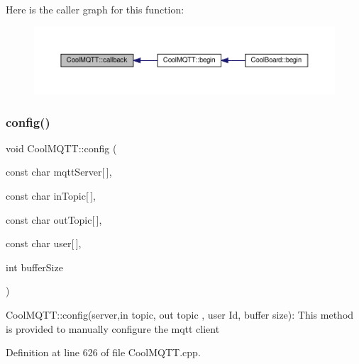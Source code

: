 Here is the caller graph for this function\+:\nopagebreak
\begin{figure}[H]
\begin{center}
\leavevmode
\includegraphics[width=350pt]{d0/dd0/class_cool_m_q_t_t_a30d82ad665bfb603f46ecdbc290775df_icgraph}
\end{center}
\end{figure}
\mbox{\label{class_cool_m_q_t_t_a9b703de4f1358f0ee7a5e8c44979c648}} 
\subsubsection{\texorpdfstring{config()}{config()}\hspace{0.1cm}{\footnotesize\ttfamily [1/2]}}
{\footnotesize\ttfamily void Cool\+M\+Q\+T\+T\+::config (\begin{DoxyParamCaption}\item[{const char}]{mqtt\+Server\mbox{[}$\,$\mbox{]},  }\item[{const char}]{in\+Topic\mbox{[}$\,$\mbox{]},  }\item[{const char}]{out\+Topic\mbox{[}$\,$\mbox{]},  }\item[{const char}]{user\mbox{[}$\,$\mbox{]},  }\item[{int}]{buffer\+Size }\end{DoxyParamCaption})}

Cool\+M\+Q\+T\+T\+::config(server,in topic, out topic , user Id, buffer size)\+: This method is provided to manually configure the mqtt client 

Definition at line 626 of file Cool\+M\+Q\+T\+T.\+cpp.


